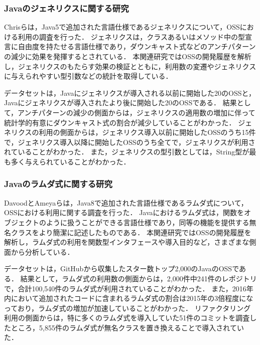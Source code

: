 \subsubsection{Javaのジェネリクスに関する研究\label{generics_research}}
Chrisらは，Java5で追加された言語仕様であるジェネリクスについて，OSSにおける利用の調査を行った\cite{Generics_Research}．
ジェネリクスは，クラスあるいはメソッド中の型宣言に自由度を持たせる言語仕様であり，ダウンキャスト式などのアンチパターンの減少に効果を発揮するとされている．
本関連研究ではOSSの開発履歴を解析し，ジェネリクスのもたらす効果の検証とともに，利用数の変遷やジェネリクスに与えられやすい型引数などの統計を取得している．

データセットは，Javaにジェネリクスが導入される以前に開始した20のOSSと，Javaにジェネリクスが導入されたより後に開始した20のOSSである．
結果として，アンチパターンの減少の側面からは，ジェネリクスの適用数の増加に伴って統計学的有意にダウンキャスト式の割合が減少していることがわかった．
ジェネリクスの利用の側面からは，ジェネリクス導入以前に開始したOSSのうち15件で，ジェネリクス導入以降に開始したOSSのうち全てで，ジェネリクスが利用されていることがわかった．
また，ジェネリクスの型引数としては，String型が最も多く与えられていることがわかった．

\subsubsection{Javaのラムダ式に関する研究\label{lambda_research}}
DavoodとAmeyaらは，Java8で追加された言語仕様であるラムダ式について，OSSにおける利用に関する調査を行った\cite{Generics_Research}．
Javaにおけるラムダ式は，関数をオブジェクトのように扱うことができる言語仕様であり，同等の機能を提供する無名クラスをより簡潔に記述したものである．
本関連研究ではOSSの開発履歴を解析し，ラムダ式の利用を関数型インタフェースや導入目的など，さまざまな側面から分析している．

データセットは，GitHubから収集したスター数トップ2,000のJavaのOSSである．
結果として，ラムダ式の利用数の側面からは，2,000件中241件のレポジトリで，合計100,540件のラムダ式が利用されていることがわかった．
また，2016年内において追加されたコードに含まれるラムダ式の割合は2015年の3倍程度になっており，ラムダ式の増加が加速していることがわかった．
リファクタリング利用の側面からは，特に多くのラムダ式を導入していた51件のコミットを調査したところ，5,855件のラムダ式が無名クラスを置き換えることで導入されていた．

